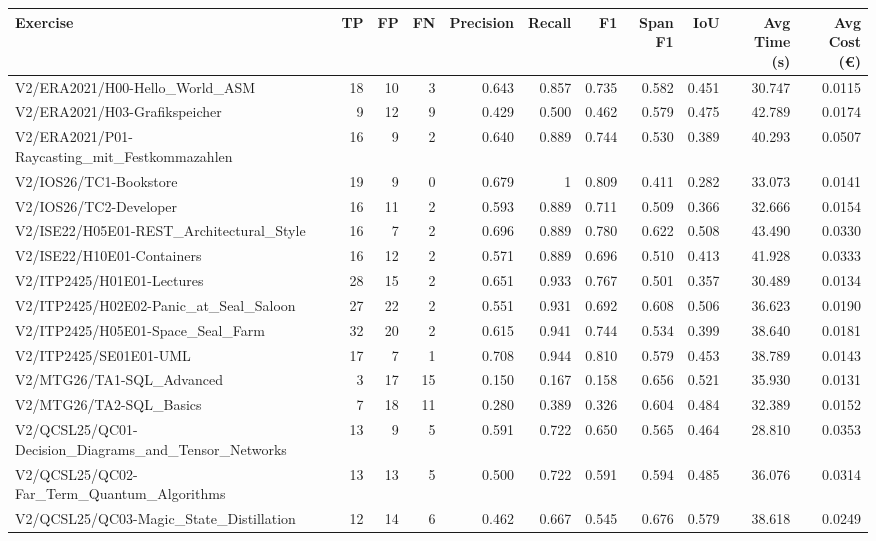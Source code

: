 \begin{tabular}{lrrrrrrrrrr}
Exercise & TP & FP & FN & Precision & Recall & F1 & Span F1 & IoU & Avg Time (s) & Avg Cost (€) \\
\hline
V2/ERA2021/H00-Hello\_World\_ASM & 18 & 10 & 3 & 0.643 & 0.857 & 0.735 & 0.582 & 0.451 & 30.747 & 0.0115 \\
V2/ERA2021/H03-Grafikspeicher & 9 & 12 & 9 & 0.429 & 0.500 & 0.462 & 0.579 & 0.475 & 42.789 & 0.0174 \\
V2/ERA2021/P01-Raycasting\_mit\_Festkommazahlen & 16 & 9 & 2 & 0.640 & 0.889 & 0.744 & 0.530 & 0.389 & 40.293 & 0.0507 \\
V2/IOS26/TC1-Bookstore & 19 & 9 & 0 & 0.679 & 1 & 0.809 & 0.411 & 0.282 & 33.073 & 0.0141 \\
V2/IOS26/TC2-Developer & 16 & 11 & 2 & 0.593 & 0.889 & 0.711 & 0.509 & 0.366 & 32.666 & 0.0154 \\
V2/ISE22/H05E01-REST\_Architectural\_Style & 16 & 7 & 2 & 0.696 & 0.889 & 0.780 & 0.622 & 0.508 & 43.490 & 0.0330 \\
V2/ISE22/H10E01-Containers & 16 & 12 & 2 & 0.571 & 0.889 & 0.696 & 0.510 & 0.413 & 41.928 & 0.0333 \\
V2/ITP2425/H01E01-Lectures & 28 & 15 & 2 & 0.651 & 0.933 & 0.767 & 0.501 & 0.357 & 30.489 & 0.0134 \\
V2/ITP2425/H02E02-Panic\_at\_Seal\_Saloon & 27 & 22 & 2 & 0.551 & 0.931 & 0.692 & 0.608 & 0.506 & 36.623 & 0.0190 \\
V2/ITP2425/H05E01-Space\_Seal\_Farm & 32 & 20 & 2 & 0.615 & 0.941 & 0.744 & 0.534 & 0.399 & 38.640 & 0.0181 \\
V2/ITP2425/SE01E01-UML & 17 & 7 & 1 & 0.708 & 0.944 & 0.810 & 0.579 & 0.453 & 38.789 & 0.0143 \\
V2/MTG26/TA1-SQL\_Advanced & 3 & 17 & 15 & 0.150 & 0.167 & 0.158 & 0.656 & 0.521 & 35.930 & 0.0131 \\
V2/MTG26/TA2-SQL\_Basics & 7 & 18 & 11 & 0.280 & 0.389 & 0.326 & 0.604 & 0.484 & 32.389 & 0.0152 \\
V2/QCSL25/QC01-Decision\_Diagrams\_and\_Tensor\_Networks & 13 & 9 & 5 & 0.591 & 0.722 & 0.650 & 0.565 & 0.464 & 28.810 & 0.0353 \\
V2/QCSL25/QC02-Far\_Term\_Quantum\_Algorithms & 13 & 13 & 5 & 0.500 & 0.722 & 0.591 & 0.594 & 0.485 & 36.076 & 0.0314 \\
V2/QCSL25/QC03-Magic\_State\_Distillation & 12 & 14 & 6 & 0.462 & 0.667 & 0.545 & 0.676 & 0.579 & 38.618 & 0.0249 \\
\end{tabular}
